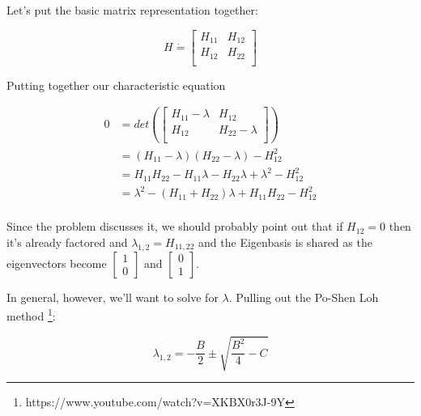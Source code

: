 \begin{answer}

  Let's put the basic matrix representation together:

  \begin{equation}
    H \dot{=}
    \begin{bmatrix}
      H_{11} & H_{12}\\
      H_{12} & H_{22}\\
    \end{bmatrix}
  \end{equation}

  Putting together our characteristic equation

  \begin{equation}
    \begin{split}
      0 &=
      det\left(
      \begin{bmatrix}
        H_{11} - \lambda & H_{12}\\
        H_{12} & H_{22} - \lambda\\
      \end{bmatrix}
      \right)\\
      &= (H_{11} - \lambda)(H_{22} - \lambda) - H_{12}^2\\
      &= H_{11}H_{22} - H_{11}\lambda - H_{22}\lambda + \lambda^2 - H_{12}^2\\
      &= \lambda^2 - (H_{11} + H_{22})\lambda + H_{11}H_{22} - H_{12}^2\\
    \end{split}
  \end{equation}

  Since the problem discusses it, we should probably point out that if
  $H_{12} = 0$ then it's already factored and $\lambda_{1,2} =
  H_{11,22}$ and the Eigenbasis is shared as the eigenvectors become
  $\begin{bmatrix}1\\0\end{bmatrix}$ and
    $\begin{bmatrix}0\\1\end{bmatrix}$.

  In general, however, we'll want to solve for $\lambda$.  Pulling out
  the Po-Shen Loh
  method \footnote{https://www.youtube.com/watch?v=XKBX0r3J-9Y}:

  \begin{equation}
    \lambda_{1,2} = -\frac{B}{2} \pm \sqrt{\frac{B^2}{4} - C}
  \end{equation}


\end{answer}
